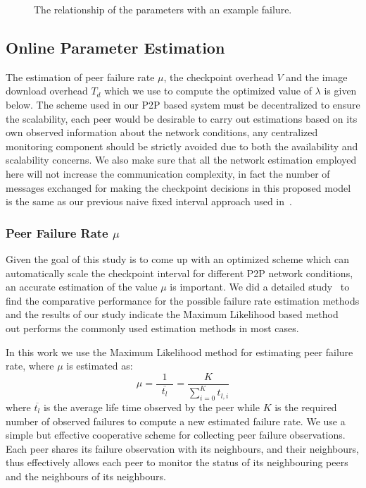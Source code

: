 \documentclass[times, 12pt, onecolumn]{article}
\begin{document}
\begin{figure}
\caption{The relationship of the parameters with an example failure.}
\label{timeline}
\end{figure}

 

\subsection{Online Parameter Estimation}
\label{estimation}
The estimation of peer failure rate $\mu$, the checkpoint overhead $V$ and the image download overhead 
$T_d$ which we use to compute the optimized value of $\lambda$ is given below. The scheme used in our 
P2P based system must be decentralized to ensure the scalability, each peer would be desirable to carry 
out estimations based on its own observed information about the network conditions, any centralized 
monitoring component should be strictly avoided due to both the availability and scalability concerns. 
We also make sure that all the network estimation employed here will not increase the communication 
complexity, in fact the number of messages exchanged for making the checkpoint decisions in this proposed 
model is the same as our previous naive fixed interval approach used in~\cite{dvm,mpichopen}.

\subsubsection{Peer Failure Rate $\mu$}
\label{failureestimation}
Given the goal of this study is to come up with an optimized scheme which can automatically scale the
checkpoint interval for different P2P network conditions, an accurate estimation of the value $\mu$ 
is important. We did a detailed study~\cite{estimation} to find the comparative performance for the possible failure rate 
estimation methods and the results of our study indicate the Maximum Likelihood based method~\cite{estimation} out performs 
the commonly used estimation methods in most cases. 

In this work we use the Maximum Likelihood method for estimating peer failure rate, where 
$\mu$ is estimated as: 
\begin{equation}
\mu=\frac{1}{\;\;\overline{t_{l}}\;\;}=\frac{K}{\sum_{i=0}^K{t_{l,i}}}
\label{max-likelihood}
\end{equation}
where $\overline{t_{l}}$ is the average life time observed by the peer while $K$ is the required number of 
observed failures to compute a new estimated failure rate. We use a simple but effective cooperative scheme 
for collecting peer failure observations. Each peer shares its failure observation with its neighbours, and
their neighbours, thus effectively allows each peer to monitor the status of its neighbouring peers and the 
neighbours of its neighbours.    
\end{document}
